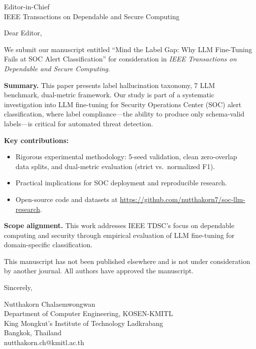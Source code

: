 \documentclass[11pt]{letter}
\begin{document}
\begin{letter}{Editor-in-Chief \\ IEEE Transactions on Dependable and Secure Computing}

\opening{Dear Editor,}

We submit our manuscript entitled ``Mind the Label Gap: Why LLM Fine-Tuning Fails at SOC Alert Classification'' for consideration in \textit{IEEE Transactions on Dependable and Secure Computing}.

\textbf{Summary.} This paper presents label hallucination taxonomy, 7 LLM benchmark, dual-metric framework. Our study is part of a systematic investigation into LLM fine-tuning for Security Operations Center (SOC) alert classification, where label compliance---the ability to produce only schema-valid labels---is critical for automated threat detection.

\textbf{Key contributions:}
\begin{itemize}
\item Rigorous experimental methodology: 5-seed validation, clean zero-overlap data splits, and dual-metric evaluation (strict vs.\ normalized F1).
\item Practical implications for SOC deployment and reproducible research.
\item Open-source code and datasets at \url{https://github.com/nutthakorn7/soc-llm-research}.
\end{itemize}

\textbf{Scope alignment.} This work addresses IEEE TDSC's focus on dependable computing and security through empirical evaluation of LLM fine-tuning for domain-specific classification.

This manuscript has not been published elsewhere and is not under consideration by another journal. All authors have approved the manuscript.

\closing{Sincerely,}

Nutthakorn Chalaemwongwan \\
Department of Computer Engineering, KOSEN-KMITL \\
King Mongkut's Institute of Technology Ladkrabang \\
Bangkok, Thailand \\
nutthakorn.ch@kmitl.ac.th

\end{letter}
\end{document}

